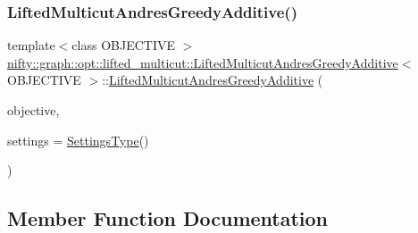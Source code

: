 \subsubsection{\texorpdfstring{Lifted\+Multicut\+Andres\+Greedy\+Additive()}{LiftedMulticutAndresGreedyAdditive()}}
{\footnotesize\ttfamily template$<$class O\+B\+J\+E\+C\+T\+I\+VE $>$ \\
\hyperlink{classnifty_1_1graph_1_1opt_1_1lifted__multicut_1_1LiftedMulticutAndresGreedyAdditive}{nifty\+::graph\+::opt\+::lifted\+\_\+multicut\+::\+Lifted\+Multicut\+Andres\+Greedy\+Additive}$<$ O\+B\+J\+E\+C\+T\+I\+VE $>$\+::\hyperlink{classnifty_1_1graph_1_1opt_1_1lifted__multicut_1_1LiftedMulticutAndresGreedyAdditive}{Lifted\+Multicut\+Andres\+Greedy\+Additive} (\begin{DoxyParamCaption}\item[{const \hyperlink{classnifty_1_1graph_1_1opt_1_1lifted__multicut_1_1LiftedMulticutAndresGreedyAdditive_a17071365067415acd658d848f37f361a}{Objective\+Type} \&}]{objective,  }\item[{const \hyperlink{structnifty_1_1graph_1_1opt_1_1lifted__multicut_1_1LiftedMulticutAndresGreedyAdditive_1_1SettingsType}{Settings\+Type} \&}]{settings = {\ttfamily \hyperlink{structnifty_1_1graph_1_1opt_1_1lifted__multicut_1_1LiftedMulticutAndresGreedyAdditive_1_1SettingsType}{Settings\+Type}()} }\end{DoxyParamCaption})}



\subsection{Member Function Documentation}
\mbox{\label{classnifty_1_1graph_1_1opt_1_1lifted__multicut_1_1LiftedMulticutAndresGreedyAdditive_aeada6b7d38bc3309ee96048bd41dc039}} 
